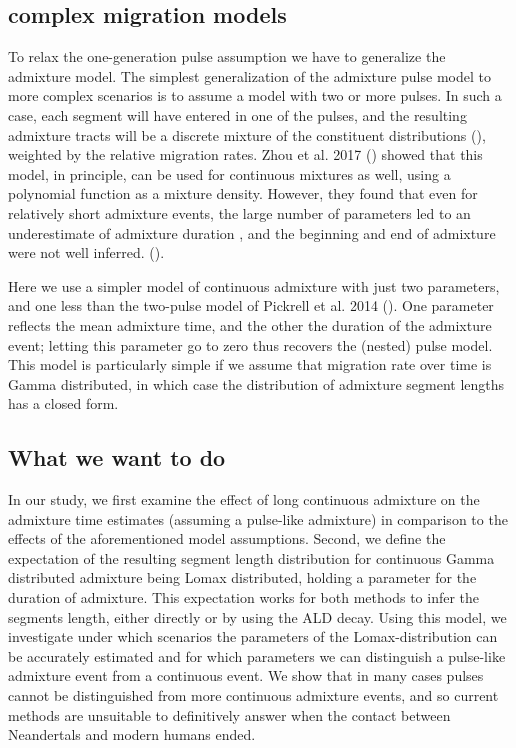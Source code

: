 \documentclass[]{article}
\begin{document}
\subsection{complex migration models}

To relax the one-generation pulse assumption we have to generalize the admixture model.
The simplest generalization of the admixture pulse model to more complex scenarios is to assume a model with two or more pulses. In such a case,  each segment will have entered in one of the pulses, and the resulting admixture tracts will be a discrete mixture of the constituent distributions (\cite{pickrell_ancient_2014}), weighted by the relative migration rates. Zhou et al. 2017 (\cite{zhou_modeling_2017}) showed that this model, in principle, can be used for continuous mixtures as well, using a polynomial function as a mixture density. However, they found that even for relatively short admixture events, the large number of parameters led to an underestimate of admixture duration \cite{zhou_inference_2017}, and the beginning and end of admixture were not well inferred.
(\cite{zhou_modeling_2017,zhou_inference_2017}). 

Here we use a simpler model of continuous admixture with just two parameters, and one less than the two-pulse model of Pickrell et al. 2014 (\cite{pickrell_ancient_2014}). One parameter reflects the mean admixture time, and the other the duration of the admixture event; letting this parameter go to zero thus recovers the (nested) pulse model. 
This model is particularly simple if we assume that migration rate over time is Gamma distributed, in which case the distribution of admixture segment lengths has a closed form.

\subsection{What we want to do}\label{what-we-want-to-do}
In our  study, we first examine the  effect of long
continuous admixture on the admixture time estimates (assuming a pulse-like admixture) in comparison to
the effects of the aforementioned model assumptions. Second, we define
the expectation of the resulting segment length distribution for
continuous Gamma distributed admixture being Lomax distributed, holding
a parameter for the duration of admixture. This expectation works for
both methods to infer the segments length, either directly or by using
the ALD decay. Using this model, we investigate under which scenarios
the parameters of the Lomax-distribution can be accurately estimated and
for which parameters we can distinguish a pulse-like admixture event
from a continuous event. We show that in many cases pulses cannot be
distinguished from more continuous admixture events, and so current
methods are unsuitable to definitively answer when the contact between
Neandertals and modern humans ended.
\end{document}
